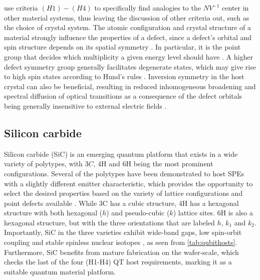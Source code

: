 
\citeauthor{Weber2010} \cite{Weber2010} use criteria $(H1)-(H4)$ to specifically find analogies to the $NV^{-1}$ center in other material systems, thus leaving the discussion of other criteria out, such as the choice of crystal system. The atomic configuration and crystal structure of a material strongly influence the properties of a defect, since a defect's orbital and spin structure depends on its spatial symmetry \cite{Bassett2019}. In particular, it is the point group that decides which multiplicity a given energy level should have \cite{James1976}. A higher defect symmetry group generally facilitates degenerate states, which may give rise to high spin states according to Hund's rules \cite{Bassett2019, Togan2010}. Inversion symmetry in the host crystal can also be beneficial, resulting in reduced inhomogeneous broadening and spectral diffusion of optical transitions as a consequence of the defect orbitals being generally insensitive to external electric fields \cite{Bassett2019}.

\subsection{Silicon carbide}
\label{silicon-carbide}

Silicon carbide (SiC) is an emerging quantum platform that exists in a wide variety of polytypes, with $3C$, 4H and 6H being the most prominent configurations. Several of the polytypes have been demonstrated to host SPEs with a slightly different emitter characteristic, which provides the opportunity to select the desired properties based on the variety of lattice configurations and point defects available \cite{Weber2010, Son2020, Falk2013}. While 3C has a cubic structure, 4H has a hexagonal structure with both hexagonal ($h$) and pseudo-cubic ($k$) lattice sites. 6H is also a hexagonal structure, but with the three orientations that are labeled $h$, $k_1$ and $k_2$. Importantly, SiC in the three varieties exhibit wide-band gaps, low spin-orbit coupling and stable spinless nuclear isotopes \cite{Neudeck1995, Weber2010, Martienssen2005}, as seen from \autoref{tab:qubithosts}. Furthermore, SiC benefits from mature fabrication on the wafer-scale, which checks the last of the four (H1-H4) QT host requirements, marking it as a suitable quantum material platform.

